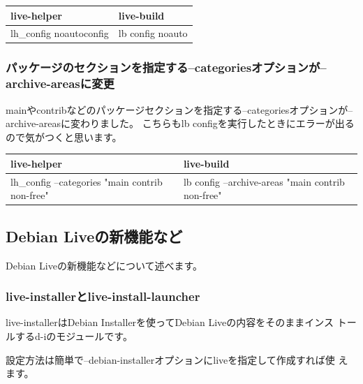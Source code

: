 \documentclass[mingoth,a4paper]{jsarticle}
\begin{document}
\begin{table}[h]
\begin{center}
 \begin{tabular}{|l|l|}
 \hline
 live-helper & live-build \\
 \hline \hline
 lh\_config noautoconfig & lb config noauto  \\
 \hline
 \end{tabular}
\end{center}
\end{table}

\subsubsection{パッケージのセクションを指定する--categoriesオプションが--archive-areasに変更}

mainやcontribなどのパッケージセクションを指定する--categoriesオプションが--archive-areasに変わりました。
こちらもlb configを実行したときにエラーが出るので気がつくと思います。

\begin{table}[h]
\begin{center}
 \begin{tabular}{|l|l|}
 \hline
 live-helper & live-build \\
 \hline \hline
 lh\_config --categories "main contrib non-free" &
 lb config --archive-areas "main contrib non-free"  \\
 \hline
 \end{tabular}
\end{center}
\end{table}

\subsection{Debian Liveの新機能など}
Debian Liveの新機能などについて述べます。

\subsubsection{live-installerとlive-install-launcher}
live-installerはDebian Installerを使ってDebian Liveの内容をそのままインス
トールするd-iのモジュールです。

設定方法は簡単で--debian-installerオプションにliveを指定して作成すれば使
えます。

\end{document}
